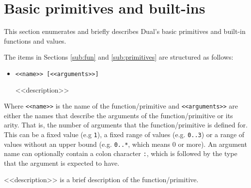 \section{Basic primitives and built-ins}\label{sec:primitives}
This section enumerates and briefly describes Dual's basic primitives and built-in functions and values.

The items in Sections \ref{sub:fun} and \ref{sub:primitives} are structured as follows:
\begin{itemize}
    \item \texttt{<<name>> [<<arguments>>]}
    
    <<description>>
\end{itemize}

Where \texttt{<<name>>} is the name of the function/primitive and
\texttt{<<arguments>>} are either the names that describe the arguments of the
function/primitive or its arity. That is, the number of arguments that the
function/primitive is defined for. This can be a fixed value (e.g
\texttt{1}), a fixed range of values (e.g. \texttt{0..3}) or a range of
values without an upper bound (e.g. \texttt{0..*}, which means 0 or more). An argument name can optionally contain a colon character \texttt{:}, which is followed by the type that the argument is expected to have.

<<description>> is a brief description of the function/primitive.

